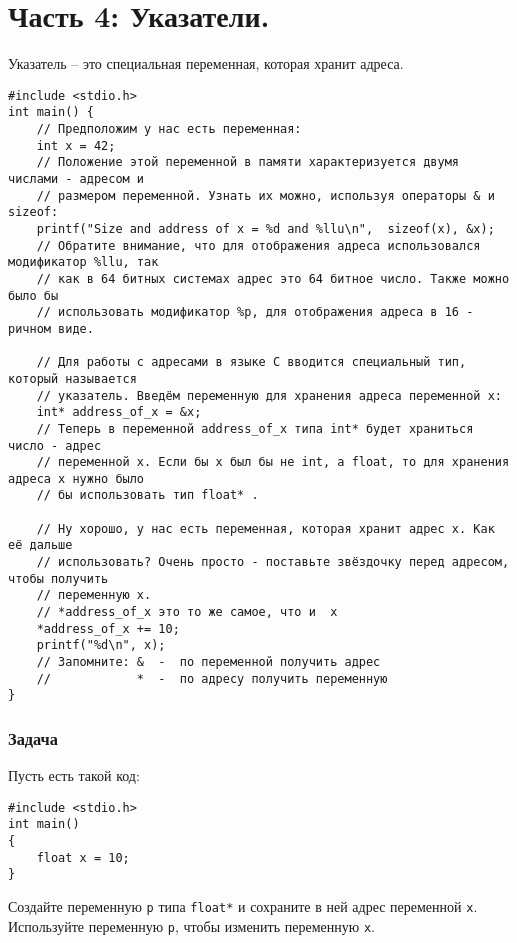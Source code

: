 \documentclass{article}
\begin{document}
\newpage
\section*{Часть 4: Указатели.}
Указатель -- это специальная переменная, которая хранит адреса.
\begin{lstlisting}
#include <stdio.h>
int main() { 
    // Предположим у нас есть переменная:
    int x = 42; 
    // Положение этой переменной в памяти характеризуется двумя числами - адресом и 
    // размером переменной. Узнать их можно, используя операторы & и sizeof:
    printf("Size and address of x = %d and %llu\n",  sizeof(x), &x);
    // Обратите внимание, что для отображения адреса использовался модификатор %llu, так 
    // как в 64 битных системах адрес это 64 битное число. Также можно было бы 
    // использовать модификатор %p, для отображения адреса в 16 - ричном виде.
    
    // Для работы с адресами в языке C вводится специальный тип, который называется 
    // указатель. Введём переменную для хранения адреса переменной x:
    int* address_of_x = &x;
    // Теперь в переменной address_of_x типа int* будет храниться число - адрес 
    // переменной x. Если бы x был бы не int, а float, то для хранения адреса x нужно было 
    // бы использовать тип float* .
    
    // Ну хорошо, у нас есть переменная, которая хранит адрес x. Как её дальше 
    // использовать? Очень просто - поставьте звёздочку перед адресом, чтобы получить 
    // переменную x.
    // *address_of_x это то же самое, что и  x
    *address_of_x += 10;
    printf("%d\n", x);
    // Запомните: &  -  по переменной получить адрес
    //            *  -  по адресу получить переменную
} 
\end{lstlisting}

\subsubsection*{Задача}
Пусть есть такой код:
\begin{lstlisting}
#include <stdio.h>
int main() 
{ 
    float x = 10;
} 
\end{lstlisting}
Создайте переменную \texttt{p} типа \texttt{float*} и сохраните в ней адрес переменной \texttt{x}. Используйте переменную \texttt{p}, чтобы изменить переменную \texttt{x}.
\end{document}
